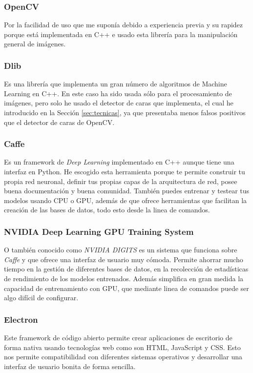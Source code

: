 \documentclass[a4paper,11pt]{book}
\begin{document}
\subsubsection{OpenCV \cite{opencv}}\label{sub:opencv}
Por la facilidad de uso que me suponía debido a experiencia previa y su rapidez porque está implementada en C++ e usado esta librería para la manipulación general de imágenes.
\subsubsection{Dlib \cite{dlib}}\label{sub:dlib}
Es una librería que implementa un gran número de algoritmos de Machine Learning en C++. En este caso ha sido usada sólo para el procesamiento de imágenes, pero solo he usado el detector de caras que implementa, el cual he introducido en la Sección \ref{sec:tecnicas}, ya que presentaba menos falsos positivos que el detector de caras de OpenCV\cite{king14}.
\subsubsection{Caffe \cite{caffe}}\label{sub:caffe}
Es un framework de \textit{Deep Learning} implementado en C++ aunque tiene una interfaz en Python. He escogido esta herramienta porque te permite construir tu propia red neuronal, definir tus propias capas de la arquitectura de red, posee buena documentación y buena comunidad. También puedes entrenar y testear tus modelos usando CPU o GPU, además de que ofrece herramientas que facilitan la creación de las bases de datos, todo esto desde la linea de comandos.
\subsubsection{NVIDIA Deep Learning GPU Training System \cite{digits}}\label{sub:digits}
O también conocido como \textit{NVIDIA DIGITS} es un sistema que funciona sobre \textit{Caffe} y que ofrece una interfaz de usuario muy cómoda. Permite ahorrar mucho tiempo en la gestión de diferentes bases de datos, en la recolección de estadísticas de rendimiento de los modelos entrenados. Además simplifica en gran medida la capacidad de entrenamiento con GPU, que mediante linea de comandos puede ser algo difícil de configurar.
\subsubsection{Electron \cite{electron}}\label{sub:electron}
Este framework de código abierto permite crear aplicaciones de escritorio de forma nativa usando tecnologías web como son HTML, JavaScript y CSS. Esto nos permite compatibilidad con diferentes sistemas operativos y desarrollar una interfaz de usuario bonita de forma sencilla.
\end{document}
